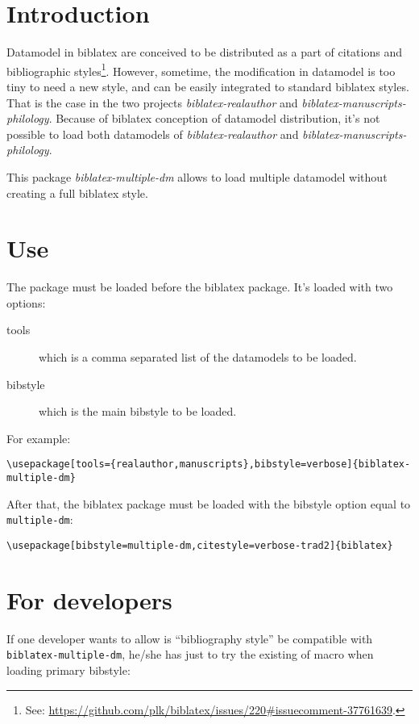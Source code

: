 \documentclass{ltxdockit}[2011/03/25]
\newcommand{\biblatex}{biblatex\xspace}
\begin{document}
\printtitlepage
\tableofcontents

\section{Introduction}
Datamodel in \biblatex are conceived to be distributed as a part of citations and bibliographic styles\footnote{See: \url{https://github.com/plk/biblatex/issues/220\#issuecomment-37761639}.}. However, sometime, the modification in datamodel is too tiny to need a new style, and can be easily integrated to standard \biblatex styles. That is the case in the two projects \emph{biblatex-realauthor} and \emph{biblatex-manuscripts-philology}. Because of \biblatex conception of datamodel distribution, it's not possible to load both datamodels of \emph{biblatex-realauthor} and \emph{biblatex-manuscripts-philology}.

This package \emph{biblatex-multiple-dm} allows to load multiple datamodel without creating a full \biblatex style. 

\section{Use}
The package must be loaded before the \biblatex package. It's loaded with two options:
\begin{description}
	\item[tools] which is a comma separated list of the datamodels to be loaded.
	\item[bibstyle] which is the main bibstyle to be loaded.
\end{description}

For example:
\begin{verbatim}
\usepackage[tools={realauthor,manuscripts},bibstyle=verbose]{biblatex-multiple-dm}
\end{verbatim}

After that, the \biblatex package must be loaded with the bibstyle option equal to \verb+multiple-dm+:
\begin{verbatim}
\usepackage[bibstyle=multiple-dm,citestyle=verbose-trad2]{biblatex}
\end{verbatim}


\section{For developers} 

If one developer wants to allow is \enquote{bibliography style} be compatible with \verb+biblatex-multiple-dm+, he/she has just to try the existing of  macro  when loading primary bibstyle:
\end{document}
